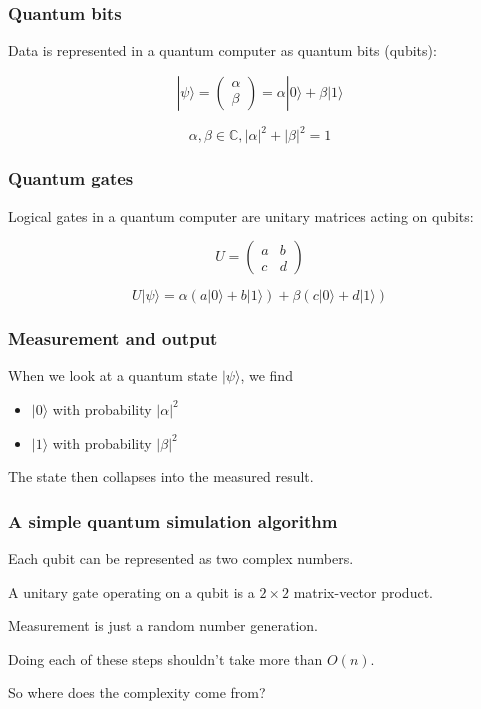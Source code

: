 \documentclass[]{beamer}
\begin{document}

\begin{frame}
\frametitle{Quantum bits}

Data is represented in a quantum computer as quantum bits (qubits):

$$
|\psi\rangle = \begin{pmatrix}
\alpha\\
\beta
\end{pmatrix} = \alpha|0\rangle + \beta|1\rangle
$$

$$\alpha, \beta \in \mathbb{C}, |\alpha|^2 + |\beta|^2 = 1$$
\end{frame}

\begin{frame}
\frametitle{Quantum gates}

Logical gates in a quantum computer are unitary matrices acting on qubits:

$$
U = \begin{pmatrix}
a & b\\
c & d
\end{pmatrix}
$$

$$U|\psi\rangle = \alpha(a|0\rangle + b|1\rangle) + \beta(c|0\rangle + d|1\rangle)$$
\end{frame}

\begin{frame}
\frametitle{Measurement and output}

When we look at a quantum state $|\psi\rangle$, we find

\begin{itemize}
\item $|0\rangle$ with probability $|\alpha|^2$
\item $|1\rangle$ with probability $|\beta|^2$
\end{itemize}

The state then collapses into the measured result.
\end{frame}

\begin{frame}
\frametitle{A simple quantum simulation algorithm}

Each qubit can be represented as two complex numbers.

A unitary gate operating on a qubit is a $2\times2$ matrix-vector product.

Measurement is just a random number generation.

Doing each of these steps shouldn't take more than $O(n)$.

So where does the complexity come from?
\end{frame}
\end{document}
